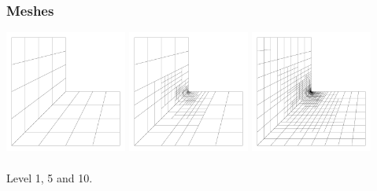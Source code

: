 \documentclass{beamer}
\begin{document}
\begin{frame}
  \frametitle{Meshes}

 \begin{center}
   \includegraphics[width=0.3\textwidth]{lshape/00-mesh}
   \includegraphics[width=0.3\textwidth]{lshape/05-mesh}
   \includegraphics[width=0.3\textwidth]{lshape/09-mesh}
   \\~\\
   Level 1, 5 and 10.
 \end{center}
\end{frame}
\end{document}
